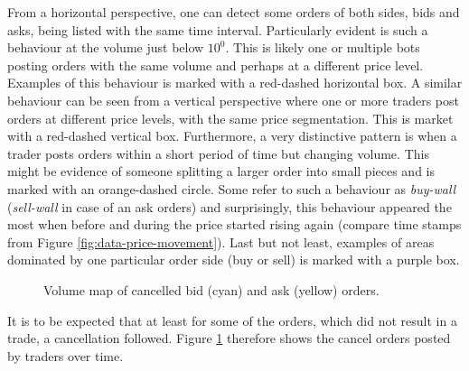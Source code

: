 From a horizontal perspective, one can detect some orders of both sides, bids and asks, being listed with the same time interval.
Particularly evident is such a behaviour at the volume just below $10^0$.
This is likely one or multiple bots posting orders with the same volume and perhaps at a different price level.
Examples of this behaviour is marked with a red-dashed horizontal box.
A similar behaviour can be seen from a vertical perspective where one or more traders post orders at different price levels, with the same price segmentation.
This is market with a red-dashed vertical box.
Furthermore, a very distinctive pattern is when a trader posts orders within a short period of time but changing volume.
This might be evidence of someone splitting a larger order into small pieces and is marked with an orange-dashed circle.
Some refer to such a behaviour as \textit{buy-wall} (\textit{sell-wall} in case of an ask orders) and surprisingly, this behaviour appeared the most when before and during the price started rising again (compare time stamps from Figure \ref{fig:data-price-movement}).
Last but not least, examples of areas dominated by one particular order side (buy or sell) is marked with a purple box.

\begin{figure}[H]
    \centering
    \caption{Volume map of cancelled bid (cyan) and ask (yellow) orders.}
    \label{fig:data-volmap-cancelled}
\end{figure}

It is to be expected that at least for some of the orders, which did not result in a trade, a cancellation followed.
Figure \ref{fig:data-volmap-cancelled} therefore shows the cancel orders posted by traders over time.

